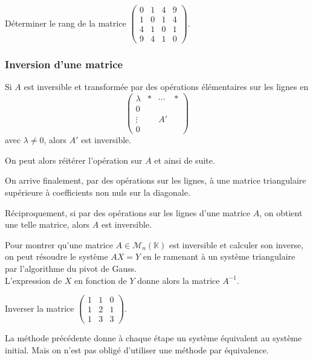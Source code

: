 \documentclass[french]{article}
\newcommand{\K}{\mathbb{K}}
\newcommand{\inv}{^{-1}}
\theoremstyle{plain}
\theoremstyle{definition}
\theoremstyle{remark}
\begin{document}
\begin{exo}
	Déterminer le rang de la matrice $\begin{pmatrix}
		0&1&4&9\\
		1&0&1&4\\
		4&1&0&1\\
		9&4&1&0
	\end{pmatrix}$.
\end{exo}

\subsubsection*{Inversion d'une matrice}

Si $A$ est inversible et transformée par des opérations élémentaires sur les lignes en $$\begin{pmatrix}
	\lambda&*&\cdots&*\\
	0&&&\\
	\vdots&&A'&\\
	0&&&
\end{pmatrix}$$ avec $\lambda\ne0$, alors $A'$ est inversible.

On peut alors réitérer l'opération sur $A$ et ainsi de suite.

On arrive finalement, par des opérations sur les lignes, à une matrice triangulaire supérieure à coefficients non nuls sur la diagonale.

Réciproquement, si par des opérations sur les lignes d'une matrice $A$, on obtient une telle matrice, alors $A$ est inversible.

\begin{met}
	Pour montrer qu'une matrice $A\in\mathcal{M}_n(\K)$ est inversible et calculer son inverse, on peut résoudre le système $AX=Y$ en le ramenant à un système triangulaire par l'algorithme du pivot de Gauss.\\
	L'expression de $X$ en fonction de $Y$ donne alors la matrice $A\inv$.
\end{met}

\begin{exo}
	Inverser la matrice $\begin{pmatrix}
		1&1&0\\
		1&2&1\\
		1&3&3
	\end{pmatrix}$.
\end{exo}

La méthode précédente donne à chaque étape un système équivalent au système initial. Mais on n'est pas obligé d'utiliser une méthode par équivalence.
\end{document}
